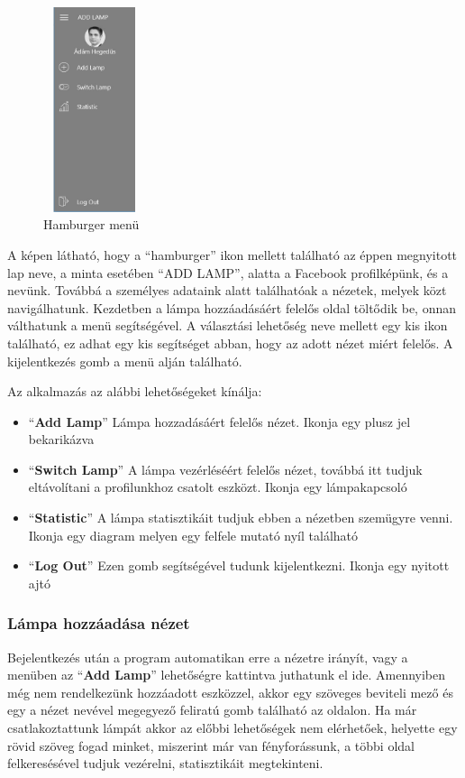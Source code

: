 \documentclass[a4paper,12pt]{report}
\begin{document}
\begin{figure}[H]
    \centering
    \includegraphics[width=3cm,height=6cm,keepaspectratio]{images/hamburgermenu.jpg}
    \caption{Hamburger menü}
    \label{fig: Hamburger}
\end{figure}

    A képen látható, hogy a ``hamburger'' ikon mellett található az éppen megnyitott lap neve, a minta esetében ``ADD LAMP'',
    alatta a Facebook profilképünk, és a nevünk.
    Továbbá a személyes adataink alatt találhatóak a nézetek, melyek közt navigálhatunk. Kezdetben a lámpa hozzáadásáért felelős
    oldal töltődik be, onnan válthatunk a menü segítségével. A választási lehetőség neve mellett egy kis ikon található, ez
    adhat egy kis segítséget abban, hogy az adott nézet miért felelős. A kijelentkezés gomb a menü alján található.

    Az alkalmazás az alábbi lehetőségeket kínálja:

\begin{itemize}
    \item ``\textbf{Add Lamp}'' Lámpa hozzadásáért felelős nézet. Ikonja egy plusz jel bekarikázva
    \item ``\textbf{Switch Lamp}'' A lámpa vezérléséért felelős nézet, továbbá itt tudjuk eltávolítani a profilunkhoz csatolt
    eszközt. Ikonja egy lámpakapcsoló
    \item ``\textbf{Statistic}'' A lámpa statisztikáit tudjuk ebben a nézetben szemügyre venni. Ikonja egy diagram melyen egy felfele
    mutató nyíl található
    \item  ``\textbf{Log Out}'' Ezen gomb segítségével tudunk kijelentkezni. Ikonja egy nyitott ajtó
\end{itemize}

\subsubsection{Lámpa hozzáadása nézet}
    Bejelentkezés után a program automatikan erre a nézetre irányít, vagy a menüben az ``\textbf{Add Lamp}'' lehetőségre
    kattintva juthatunk el ide.
    Amennyiben még nem rendelkezünk hozzáadott eszközzel, akkor egy szöveges beviteli mező és egy a nézet nevével megegyező
    feliratú gomb található az oldalon. Ha már csatlakoztattunk lámpát akkor az előbbi lehetőségek nem elérhetőek, helyette
    egy rövid szöveg fogad minket, miszerint már van fényforássunk, a többi oldal felkeresésével tudjuk vezérelni, statisztikáit
    megtekinteni.
\end{document}
